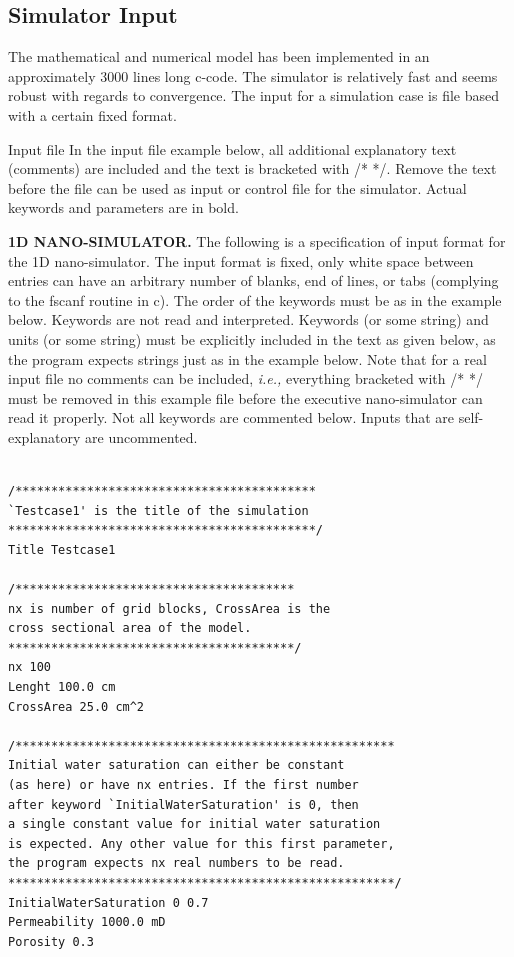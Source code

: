 \begin{appendices}
\chapter{Simulator Input \label{chap:simInput}}
\lstset{language=C}

The mathematical and numerical model has been implemented in an approximately 3000 lines long c-code. The simulator is relatively fast and seems robust with regards to convergence. The input for a simulation case is file based with a certain fixed format. 

Input file
In the input file example below, all additional explanatory text (comments) are included and the text is bracketed with /*    */. Remove the text before the file can be used as input or control file for the simulator. Actual keywords and parameters are in bold.
 

\textbf{1D NANO-SIMULATOR.}
The following is a specification of input format for the 1D nano-simulator.
The input format is fixed, only white space between entries can have an arbitrary number of blanks, end of lines, or tabs (complying to the fscanf routine in c). The order of the keywords must be as in the example below. Keywords are not read and interpreted.
Keywords (or some string) and units (or some string) must be explicitly included in the text as given below, as the program expects strings just as in the example below.
Note that for a real input file no comments can be included, \textit{i.e.,} everything bracketed with /*  */ must be removed in this example file before the executive nano-simulator can read it properly. 
Not all keywords are commented below. Inputs that are self-explanatory are uncommented.
 

\begin{lstlisting}

/******************************************
`Testcase1' is the title of the simulation 
*******************************************/
Title Testcase1

/***************************************
nx is number of grid blocks, CrossArea is the 
cross sectional area of the model.
****************************************/
nx 100
Lenght 100.0 cm
CrossArea 25.0 cm^2

/*****************************************************
Initial water saturation can either be constant 
(as here) or have nx entries. If the first number
after keyword `InitialWaterSaturation' is 0, then
a single constant value for initial water saturation
is expected. Any other value for this first parameter, 
the program expects nx real numbers to be read. 
******************************************************/  
InitialWaterSaturation 0 0.7
Permeability 1000.0 mD
Porosity 0.3


\end{lstlisting}
\end{appendices}
